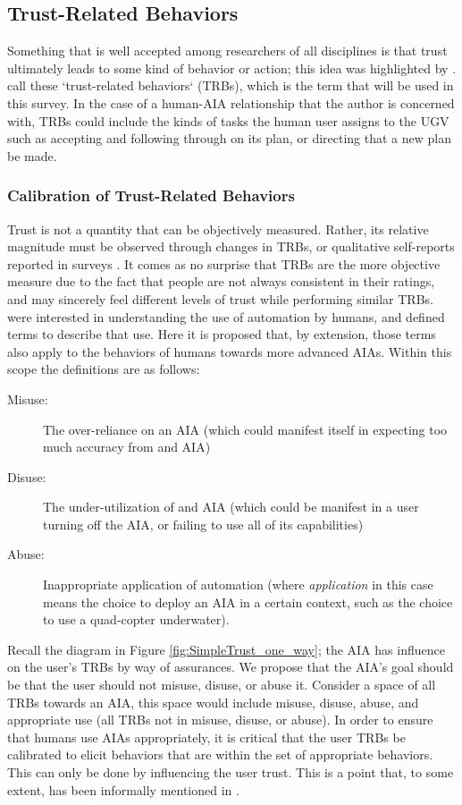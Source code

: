 \subsection{Trust-Related Behaviors} \label{sec:trbs}
Something that is well accepted among researchers of all disciplines is that trust ultimately leads to some kind of behavior or action; this idea was highlighted by \citet{Lewis1985-pr}.  \citet{McKnight2001-fa} call these `trust-related behaviors` (TRBs), which is the term that will be used in this survey. In the case of a human-AIA relationship that the author is concerned with, TRBs could include the kinds of tasks the human user assigns to the UGV such as accepting and following through on its plan, or directing that a new plan be made.

\subsubsection{Calibration of Trust-Related Behaviors}
    Trust is not a quantity that can be objectively measured. Rather, its relative magnitude must be observed through changes in TRBs, or qualitative self-reports reported in surveys \cite{Muir1996-gt}. It comes as no surprise that TRBs are the more objective measure due to the fact that people are not always consistent in their ratings, and may sincerely feel different levels of trust while performing similar TRBs. \citet{Parasuraman1997-co} were interested in understanding the use of automation by humans, and defined terms to describe that use. Here it is proposed that, by extension, those terms also apply to the behaviors of humans towards more advanced AIAs. Within this scope the definitions are as follows:
    
    \begin{description}
        \item [Misuse:] The over-reliance on an AIA (which could manifest itself in expecting too much accuracy from and AIA)
        \item [Disuse:] The under-utilization of and AIA (which could be manifest in a user turning off the AIA, or failing to use all of its capabilities)
        \item [Abuse:] Inappropriate application of automation (where \emph{application} in this case means the choice to deploy an AIA in a certain context, such as the choice to use a quad-copter underwater).
    \end{description}

    Recall the diagram in Figure \ref{fig:SimpleTrust_one_way}; the AIA has influence on the user's TRBs by way of assurances. We propose that the AIA's goal should be that the user should not misuse, disuse, or abuse it. Consider a space of all TRBs towards an AIA, this space would include misuse, disuse, abuse, and appropriate use (all TRBs not in misuse, disuse, or abuse). In order to ensure that humans use AIAs appropriately, it is critical that the user TRBs be calibrated to elicit behaviors that are within the set of appropriate behaviors. This can only be done by influencing the user trust. This is a point that, to some extent, has been informally mentioned in \citet{Muir1994-ow,Muir1987-mk,Lillard2016-yg,Lee2004-pv,Hutchins2015-if}.

